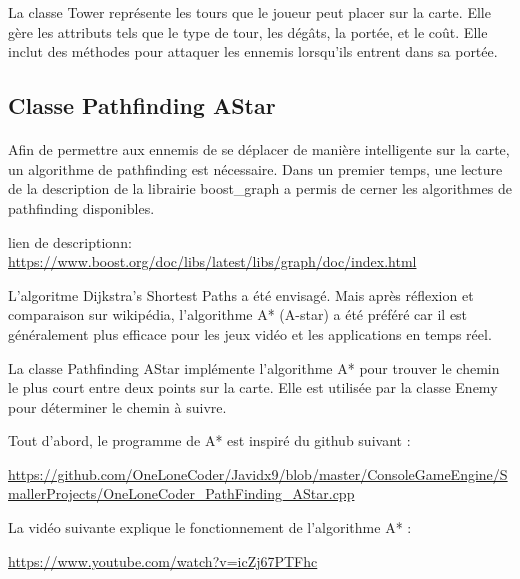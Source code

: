 \documentclass{article}
\begin{document}
La classe Tower représente les tours que le joueur peut placer sur la carte. Elle gère les attributs tels que le type de tour, les dégâts, la portée, et le coût. Elle inclut des méthodes pour attaquer les ennemis lorsqu'ils entrent dans sa portée.


\subsection{Classe Pathfinding AStar}
\paragraph{}

Afin de permettre aux ennemis de se déplacer de manière intelligente sur la carte, un algorithme de pathfinding est nécessaire.
Dans un premier temps, une lecture de la description de la librairie boost_graph a permis de cerner les algorithmes de pathfinding disponibles.

lien de descriptionn: \url{https://www.boost.org/doc/libs/latest/libs/graph/doc/index.html}

L'algoritme Dijkstra's Shortest Paths a été envisagé. Mais après réflexion et comparaison sur wikipédia, l'algorithme A* (A-star) a été préféré car il est généralement plus efficace pour les jeux vidéo et les applications en temps réel.


La classe Pathfinding AStar implémente l'algorithme A* pour trouver le chemin le plus court entre deux points sur la carte.
Elle est utilisée par la classe Enemy pour déterminer le chemin à suivre.


Tout d'abord, le programme de A* est inspiré du github suivant : 


\url{https://github.com/OneLoneCoder/Javidx9/blob/master/ConsoleGameEngine/SmallerProjects/OneLoneCoder_PathFinding_AStar.cpp}


La vidéo suivante explique le fonctionnement de l'algorithme A* : 


\url{https://www.youtube.com/watch?v=icZj67PTFhc} 
\end{document}
